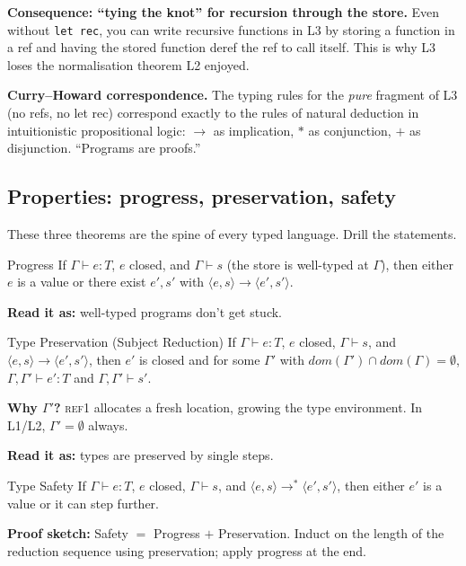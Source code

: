 \documentclass[11pt,a4paper]{article}
\newcommand{\rname}[1]{\textsc{\footnotesize#1}}
\begin{document}
\textbf{Consequence: ``tying the knot'' for recursion through the store.} Even without \texttt{let rec}, you can write recursive functions in L3 by storing a function in a ref and having the stored function deref the ref to call itself. This is why L3 loses the normalisation theorem L2 enjoyed.

\textbf{Curry--Howard correspondence.} The typing rules for the \emph{pure} fragment of L3 (no refs, no let rec) correspond exactly to the rules of natural deduction in intuitionistic propositional logic: $\to$ as implication, $*$ as conjunction, $+$ as disjunction. ``Programs are proofs.''

\subsection{Properties: progress, preservation, safety}

These three theorems are the spine of every typed language. Drill the statements.

\begin{plain}{Progress}
If $\Gamma \vdash e{:}T$, $e$ closed, and $\Gamma \vdash s$ (the store is well-typed at $\Gamma$), then either $e$ is a value or there exist $e', s'$ with $\langle e, s\rangle \to \langle e', s'\rangle$.

\textbf{Read it as:} well-typed programs don't get stuck.
\end{plain}

\begin{plain}{Type Preservation (Subject Reduction)}
If $\Gamma \vdash e{:}T$, $e$ closed, $\Gamma \vdash s$, and $\langle e, s\rangle \to \langle e', s'\rangle$, then $e'$ is closed and for some $\Gamma'$ with $\mathit{dom}(\Gamma') \cap \mathit{dom}(\Gamma) = \emptyset$, $\Gamma, \Gamma' \vdash e'{:}T$ and $\Gamma, \Gamma' \vdash s'$.

\textbf{Why $\Gamma'$?} \rname{ref1} allocates a fresh location, growing the type environment. In L1/L2, $\Gamma' = \emptyset$ always.

\textbf{Read it as:} types are preserved by single steps.
\end{plain}

\begin{plain}{Type Safety}
If $\Gamma \vdash e{:}T$, $e$ closed, $\Gamma \vdash s$, and $\langle e, s\rangle \to^* \langle e', s'\rangle$, then either $e'$ is a value or it can step further.

\textbf{Proof sketch:} Safety $=$ Progress $+$ Preservation. Induct on the length of the reduction sequence using preservation; apply progress at the end.
\end{plain}
\end{document}

